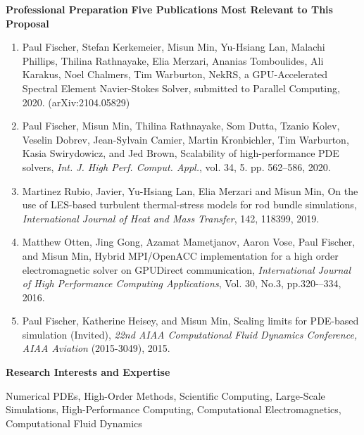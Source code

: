\documentclass[11pt,letterpaper,english]{article}
\begin{document}
\begin{flushleft} {\bf Professional Preparation}
\vspace{.04in}
{\bf Five Publications Most Relevant to This Proposal}
\vspace{-6pt}
\begin{enumerate} \itemsep1pt \parskip0pt 
\item
  Paul Fischer, Stefan Kerkemeier, Misun Min, Yu-Hsiang Lan, Malachi Phillips, Thilina Rathnayake, Elia Merzari, 
  Ananias Tomboulides, Ali Karakus, Noel Chalmers, Tim Warburton,
  NekRS, a GPU-Accelerated Spectral Element Navier-Stokes Solver,
  submitted to Parallel Computing, 2020. (arXiv:2104.05829)\\
\item Paul Fischer, Misun Min, Thilina Rathnayake, Som Dutta, Tzanio Kolev, Veselin
  Dobrev, Jean-Sylvain Camier, Martin Kronbichler, Tim Warburton, Kasia
  Swirydowicz, and Jed Brown, Scalability of high-performance PDE solvers,
  \textit{Int. J. High Perf. Comput. Appl.}, vol. 34, 5. pp. 562--586, 2020. \\
\item Martinez Rubio, Javier, Yu-Hsiang Lan, Elia Merzari and Misun Min,
On the use of LES-based turbulent thermal-stress models for rod bundle simulations,
\textit{International Journal of Heat and Mass Transfer}, 142, 118399, 2019. \\
\item Matthew Otten, Jing Gong, Azamat Mametjanov, Aaron Vose, Paul Fischer, and Misun Min,
Hybrid MPI/OpenACC implementation for a high order electromagnetic solver on GPUDirect communication,
\textit{International Journal of High Performance Computing Applications}, Vol. 30, No.3, pp.320-–334, 2016.\\
\item Paul Fischer, Katherine Heisey, and Misun Min, Scaling limits for PDE-based simulation (Invited),
\textit{22nd AIAA Computational Fluid Dynamics Conference, AIAA Aviation} (2015-3049), 2015.
\end{enumerate}

\vspace{-6pt}
{\bf Research Interests and Expertise}
{\parindent 16pt

Numerical PDEs, High-Order Methods, 
Scientific Computing, Large-Scale Simulations, High-Performance Computing,
Computational Electromagnetics, Computational Fluid Dynamics
}


\end{flushleft}
\end{document}
